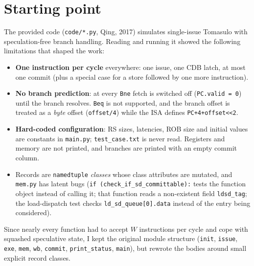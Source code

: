 \documentclass[11pt]{article}
\begin{document}
\section{Starting point}
The provided code (\texttt{code/*.py}, Qing, 2017) simulates single-issue Tomasulo with
speculation-free branch handling. Reading and running it showed the following limitations that
shaped the work:
\begin{itemize}
  \item \textbf{One instruction per cycle} everywhere: one issue, one CDB latch, at most one
        commit (plus a special case for a store followed by one more instruction).
  \item \textbf{No branch prediction}: at every \texttt{Bne} fetch is switched off
        (\texttt{PC.valid = 0}) until the branch resolves. \texttt{Beq} is not supported, and the
        branch offset is treated as a \emph{byte} offset (\texttt{offset/4}) while the ISA defines
        \texttt{PC+4+offset<<2}.
  \item \textbf{Hard-coded configuration}: RS sizes, latencies, ROB size and initial values are
        constants in \texttt{main.py}; \texttt{test\_case.txt} is never read. Registers and memory
        are not printed, and branches are printed with an empty commit column.
  \item Records are \texttt{namedtuple} \emph{classes} whose class attributes are mutated, and
        \texttt{mem.py} has latent bugs (\texttt{if (check\_if\_sd\_committable):} tests the
        function object instead of calling it; that function reads a non-existent field
        \texttt{ldsd\_tag}; the load-dispatch test checks \texttt{ld\_sd\_queue[0].data} instead
        of the entry being considered).
\end{itemize}
Since nearly every function had to accept $W$ instructions per cycle and cope with squashed
speculative state, I kept the original module structure (\texttt{init}, \texttt{issue},
\texttt{exe}, \texttt{mem}, \texttt{wb}, \texttt{commit}, \texttt{print\_status}, \texttt{main}),
but rewrote the bodies around small explicit record classes.
\end{document}
